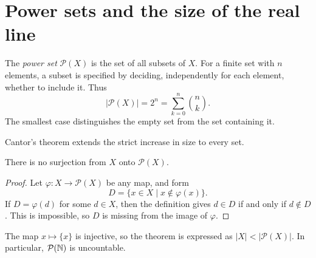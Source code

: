\section{Power sets and the size of the real line}
\label{sec:analysis-i:power-sets}

The \emph{power set} $\mathcal P(X)$ is the set of all subsets of $X$.
For a finite set with $n$ elements, a subset is specified by deciding,
independently for each element, whether to include it. Thus
\[
  |\mathcal P(X)|=2^n=\sum_{k=0}^{n}\binom{n}{k}.
\]
The smallest case distinguishes the empty set from the set containing it.


Cantor's theorem extends the strict increase in size to every set.

\begin{samepage}
\begin{theorem}[Cantor]
  \label{thm:analysis-i:cantor}
  There is no surjection from $X$ onto $\mathcal P(X)$.
\end{theorem}
\begin{proof}
  Let $\varphi:X\to\mathcal P(X)$ be any map, and form
  \[
    D=\{x\in X\mid x\notin\varphi(x)\}.
  \]
  If $D=\varphi(d)$ for some $d\in X$, then the definition gives
  $d\in D$ if and only if $d\notin D$. This is impossible, so $D$ is
  missing from the image of $\varphi$.
\end{proof}
\end{samepage}
The map $x\mapsto\{x\}$ is injective, so the theorem is expressed as
$|X|<|\mathcal P(X)|$. In particular, $\mathcal P(\mathbb{N})$ is uncountable.

